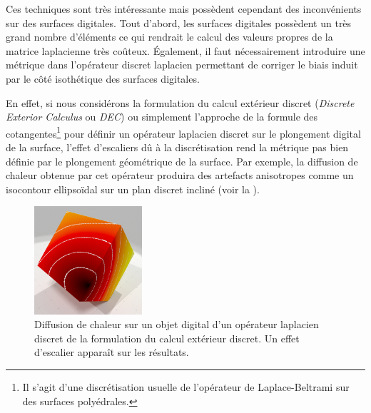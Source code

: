 Ces techniques sont très intéressante mais possèdent cependant des inconvénients
sur des surfaces digitales. Tout d'abord, les surfaces digitales possèdent un
très grand nombre d'éléments ce qui rendrait le calcul des valeurs propres de la
matrice laplacienne très coûteux. Également, il faut nécessairement introduire
une métrique dans l'opérateur discret laplacien permettant de corriger le biais
induit par le côté isothétique des surfaces digitales.


En effet, si nous considérons la formulation du calcul extérieur discret
(\emph{Discrete Exterior Calculus} ou \emph{DEC}) ou simplement l'approche de la
formule des cotangentes\footnote{Il s'agit d'une discrétisation usuelle de l'opérateur
de Laplace-Beltrami sur des surfaces polyédrales.}
pour définir un opérateur laplacien discret sur le plongement digital de la
surface, l'effet d'escaliers dû à la discrétisation rend la métrique pas bien
définie par le plongement géométrique de la surface. Par exemple, la diffusion de chaleur obtenue par cet opérateur produira des
artefacts anisotropes comme un isocontour ellipsoïdal sur un plan discret incliné (voir la ).
\begin{figure}[ht]{
    \begin{center}
    \includegraphics[width=4cm]{images/Feature/cubeIsoback}
    \end{center}}
    \caption[Problème des méthodes d'analyse spectrales sur des données digitales.]{Diffusion de chaleur sur un objet digital d'un opérateur laplacien discret de la formulation du calcul extérieur discret. Un effet d'escalier apparaît sur les résultats.
      \label{fig:staircase}}
\end{figure}
%
